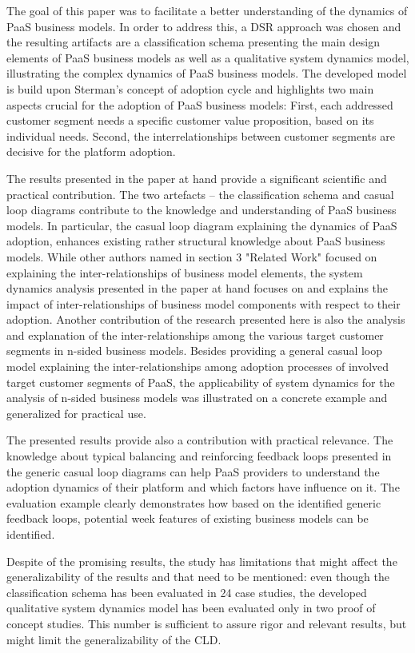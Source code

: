 The goal of this paper was to facilitate a better understanding of the dynamics of PaaS business models. In order to address this, a DSR approach was chosen and the resulting artifacts are a classification schema presenting the main design elements of PaaS business models as well as a qualitative system dynamics model, illustrating the complex dynamics of PaaS business models. The developed model is build upon Sterman's concept of adoption cycle and highlights two  main aspects crucial for the adoption of PaaS business models: First, each addressed customer segment needs a specific customer value proposition, based on its individual needs. Second, the interrelationships between customer segments are decisive for the platform adoption.

The results presented in the paper at hand provide a significant scientific and practical contribution. The two artefacts -- the classification schema and casual loop diagrams contribute to the knowledge and understanding of PaaS business models. In particular, the casual loop diagram explaining the dynamics of PaaS adoption, enhances existing rather structural knowledge about PaaS business models. While other authors named in section 3 "Related Work" focused on explaining the inter-relationships of business model elements, the system dynamics analysis presented in the paper at hand focuses on and explains the impact of inter-relationships of business model components with respect to their adoption. Another contribution of the research presented here is also the analysis and explanation of the inter-relationships among the various target customer segments in n-sided business models. Besides providing a general casual loop model explaining the inter-relationships among adoption processes of involved target customer segments of PaaS, the applicability of system dynamics for the analysis of n-sided business models was illustrated on a concrete example and generalized for practical use. 

The presented results provide also a contribution with practical relevance. The knowledge about typical balancing and reinforcing feedback loops presented in the generic casual loop diagrams can help PaaS providers to understand the adoption dynamics of their platform and which factors have influence on it. The evaluation example clearly demonstrates how based on the identified generic feedback loops, potential week features of existing business models can be identified.

Despite of the promising results, the study has limitations that might affect the generalizability of the results and that need to be mentioned: even though the classification schema has been evaluated in 24 case studies, the developed qualitative system dynamics model has been evaluated only in two proof of concept studies. This number is sufficient to assure rigor and relevant results, but might limit the generalizability of the CLD.

